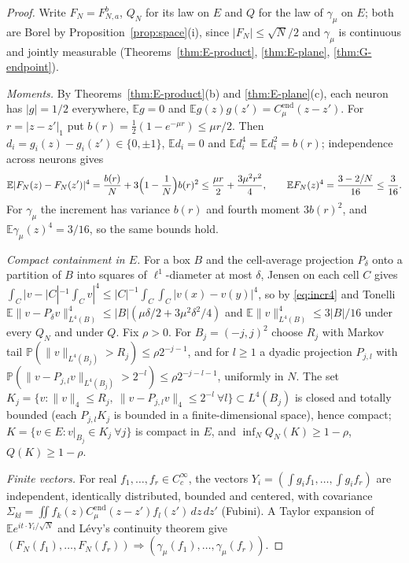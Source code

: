 \documentclass[11pt]{article}
\theoremstyle{plain}
\theoremstyle{definition}
\theoremstyle{remark}
\newcommand{\E}{\mathbb{E}}
\newcommand{\PP}{\mathbb{P}}
\newcommand{\Cend}{C^{\mathrm{end}}_{\mu}}
\begin{document}
\begin{proof}
Write $F_N=F^{b}_{N,a}$, $Q_N$ for its law on $E$ and $Q$ for the law of $\gamma_\mu$ on
$E$; both are Borel by Proposition~\ref{prop:space}(i), since
$|F_N|\le\sqrt N/2$ and $\gamma_\mu$ is continuous and jointly measurable
(Theorems~\ref{thm:E-product}, \ref{thm:E-plane}, \ref{thm:G-endpoint}).

\emph{Moments.} By Theorems~\ref{thm:E-product}(b) and \ref{thm:E-plane}(c), each
neuron has $|g|=1/2$ everywhere, $\E g=0$ and $\E g(z)g(z')=\Cend(z-z')$. For
$r=|z-z'|_1$ put $b(r)=\tfrac12(1-e^{-\mu r})\le\mu r/2$. Then
$d_i=g_i(z)-g_i(z')\in\{0,\pm1\}$, $\E d_i=0$ and $\E d_i^{4}=\E d_i^{2}=b(r)$; independence
across neurons gives
\begin{equation}\label{eq:incr4}
\E|F_N(z)-F_N(z')|^{4}=\frac{b(r)}N+3\Bigl(1-\frac1N\Bigr)b(r)^{2}\le\frac{\mu r}2+\frac{3\mu^{2}r^{2}}4,
\qquad \E F_N(z)^{4}=\frac{3-2/N}{16}\le\frac3{16}.
\end{equation}
For $\gamma_\mu$ the increment has variance $b(r)$ and fourth moment $3b(r)^{2}$, and
$\E\gamma_\mu(z)^{4}=3/16$, so the same bounds hold.

\emph{Compact containment in $E$.} For a box $B$ and the cell-average projection
$P_\delta$ onto a partition of $B$ into squares of $\ell^{1}$-diameter at most $\delta$,
Jensen on each cell $C$ gives
$\int_C|v-|C|^{-1}\!\int_Cv|^{4}\le|C|^{-1}\int_C\int_C|v(x)-v(y)|^{4}$, so by
\eqref{eq:incr4} and Tonelli
$\E\|v-P_\delta v\|^{4}_{L^{4}(B)}\le|B|(\mu\delta/2+3\mu^{2}\delta^{2}/4)$ and
$\E\|v\|^{4}_{L^{4}(B)}\le3|B|/16$ under every $Q_N$ and under $Q$. Fix $\rho>0$. For
$B_j=(-j,j)^{2}$ choose $R_j$ with Markov tail $\PP(\|v\|_{L^{4}(B_j)}>R_j)\le\rho2^{-j-1}$, and
for $l\ge1$ a dyadic projection $P_{j,l}$ with
$\PP(\|v-P_{j,l}v\|_{L^{4}(B_j)}>2^{-l})\le\rho2^{-j-l-1}$, uniformly in $N$. The set
$K_j=\{v:\|v\|_4\le R_j,\ \|v-P_{j,l}v\|_4\le2^{-l}\ \forall l\}\subset L^{4}(B_j)$ is closed and
totally bounded (each $P_{j,l}K_j$ is bounded in a finite-dimensional space), hence
compact; $K=\{v\in E:v|_{B_j}\in K_j\ \forall j\}$ is compact in $E$, and
$\inf_NQ_N(K)\ge1-\rho$, $Q(K)\ge1-\rho$.

\emph{Finite vectors.} For real $f_1,\dots,f_r\in C_c^{\infty}$, the vectors
$Y_i=(\int g_if_1,\dots,\int g_if_r)$ are independent, identically distributed, bounded
and centered, with covariance $\Sigma_{kl}=\iint f_k(z)\Cend(z-z')f_l(z')\,dz\,dz'$
(Fubini). A Taylor expansion of $\E e^{it\cdot Y_i/\sqrt N}$ and L\'evy's continuity
theorem give $(F_N(f_1),\dots,F_N(f_r))\Rightarrow(\gamma_\mu(f_1),\dots,\gamma_\mu(f_r))$.


\end{proof}
\end{document}
